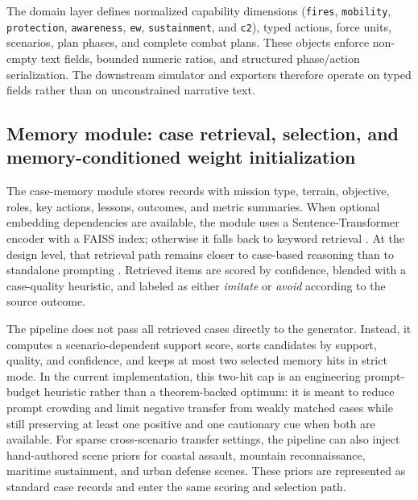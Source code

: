 The domain layer defines normalized capability dimensions (\texttt{fires}, \texttt{mobility}, \texttt{protection}, \texttt{awareness}, \texttt{ew}, \texttt{sustainment}, and \texttt{c2}), typed actions, force units, scenarios, plan phases, and complete combat plans. These objects enforce non-empty text fields, bounded numeric ratios, and structured phase/action serialization. The downstream simulator and exporters therefore operate on typed fields rather than on unconstrained narrative text.

\subsection{Memory module: case retrieval, selection, and memory-conditioned weight initialization}
\label{sec:memory-coupling}

The case-memory module stores records with mission type, terrain, objective, roles, key actions, lessons, outcomes, and metric summaries. When optional embedding dependencies are available, the module uses a Sentence-Transformer encoder with a FAISS index; otherwise it falls back to keyword retrieval \citep{lewis2020rag,reimers2019sbert,johnson2019faiss}. At the design level, that retrieval path remains closer to case-based reasoning than to standalone prompting \citep{aamodt1994cbr,kolodner1993cbr}. Retrieved items are scored by confidence, blended with a case-quality heuristic, and labeled as either \textit{imitate} or \textit{avoid} according to the source outcome.

The pipeline does not pass all retrieved cases directly to the generator. Instead, it computes a scenario-dependent support score, sorts candidates by support, quality, and confidence, and keeps at most two selected memory hits in strict mode. In the current implementation, this two-hit cap is an engineering prompt-budget heuristic rather than a theorem-backed optimum: it is meant to reduce prompt crowding and limit negative transfer from weakly matched cases while still preserving at least one positive and one cautionary cue when both are available. For sparse cross-scenario transfer settings, the pipeline can also inject hand-authored scene priors for coastal assault, mountain reconnaissance, maritime sustainment, and urban defense scenes. These priors are represented as standard case records and enter the same scoring and selection path.

